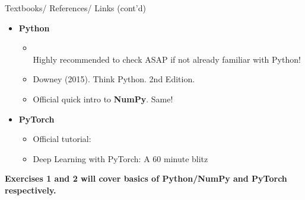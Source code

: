 \begin{frame}{Textbooks/ References/ Links (cont'd)}
	\vspace{-4mm}
\begin{itemize}
\item \textbf{Python}
\begin{itemize}
\item {}\\ \alert{Highly recommended to check ASAP if not already familiar with Python!} 
\item Downey (2015). Think Python. 2nd Edition. \\ 
\item Official quick intro to \textbf{NumPy}. \alert{Same!}\\
\end{itemize}
\vsp
\item \textbf{PyTorch}
\begin{itemize}
\item Official tutorial: 
\item Deep Learning with PyTorch: A 60 minute blitz\\
\end{itemize}
\end{itemize}
\vspace{2mm}
\textbf{Exercises 1 and 2 will cover basics of Python/NumPy and PyTorch respectively.}
\end{frame}

